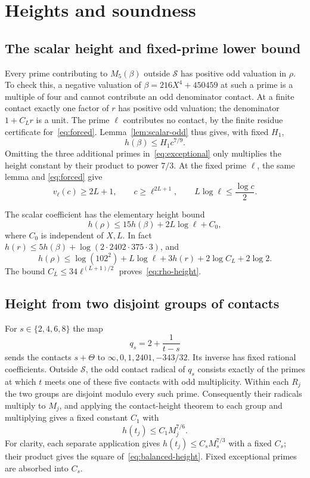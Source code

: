 \documentclass[11pt,a4paper]{article}
\begin{document}
\section{Heights and soundness}

\subsection{The scalar height and fixed-prime lower bound}

Every prime contributing to $M_5(\beta)$ outside $\mathcal S$
has positive odd valuation in $\rho$. To check this, a negative
valuation of $\beta=216X^4+450459$ at such a prime is a multiple
of four and cannot contribute an odd denominator contact. At a
finite contact exactly one factor of $r$ has positive odd valuation;
the denominator $1+C_Lr$ is a unit. The prime $\ell$ contributes
no contact, by the finite residue certificate for~\eqref{eq:forced}.
Lemma~\ref{lem:scalar-odd} thus gives, with fixed $H_1$,
\begin{equation}\label{eq:scalar-height}
 h(\beta)\le H_1c^{7/9}.
\end{equation}
Omitting the three additional primes in~\eqref{eq:exceptional}
only multiplies the height constant by their product to power
$7/3$. At the fixed prime $\ell$, the same lemma and
\eqref{eq:forced} give
\begin{equation}\label{eq:c-large}
 v_\ell(c)\ge2L+1,\qquad
 c\ge\ell^{2L+1},\qquad L\log\ell\le\frac{\log c}{2}.
\end{equation}

The scalar coefficient has the elementary height bound
\begin{equation}\label{eq:rho-height}
                    h(\rho)\le15h(\beta)+2L\log\ell+C_0,
\end{equation}
where $C_0$ is independent of $X,L$. In fact
$h(r)\le5h(\beta)+\log(2\cdot2402\cdot375\cdot3)$, and
\[
 h(\rho)\le\log(102^2)+L\log\ell+3h(r)+2\log C_L+2\log2.
\]
The bound $C_L\le34\ell^{(L+1)/2}$ proves~\eqref{eq:rho-height}.

\subsection{Height from two disjoint groups of contacts}

For $s\in\{2,4,6,8\}$ the map
\[
                       q_s=2+\frac1{t-s}
\]
sends the contacts $s+\Theta$ to
$\infty,0,1,2401,-343/32$. Its inverse has fixed rational
coefficients. Outside $\mathcal S$, the odd contact radical of
$q_s$ consists exactly of the primes at which $t$ meets one of
these five contacts with odd multiplicity. Within each $R_j$ the
two groups are disjoint modulo every such prime. Consequently their
radicals multiply to $M_j$, and applying the contact-height theorem
to each group and multiplying gives a fixed constant $C_1$ with
\begin{equation}\label{eq:balanced-height}
                         h(t_j)\le C_1 M_j^{7/6}.
\end{equation}
For clarity, each separate application gives
$h(t_j)\le C_sM_s^{7/3}$ with a fixed $C_s$; their product gives
the square of~\eqref{eq:balanced-height}. Fixed exceptional primes
are absorbed into $C_s$.
\end{document}
